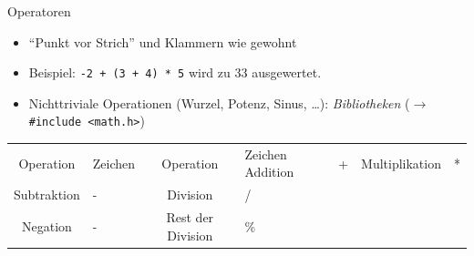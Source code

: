 
\begin{frame}[fragile]{Operatoren}
%
\begin{itemize}
	\item \enquote{Punkt vor Strich} und Klammern wie gewohnt
	\item Beispiel: \texttt{-2 + (3 + 4) * 5} wird zu 33 ausgewertet.
	\item Nichttriviale Operationen (Wurzel, Potenz, Sinus, \ldots): \emph{Bibliotheken}\newline
		($\rightarrow$ \texttt{#include <math.h>})
\end{itemize}
%
\begin{center}
\begin{tcolorbox}[title=Grundrechenarten in C]
\begin{table}
	\small
\begin{tabularx}
	{.8\linewidth}
	{cC|cC}
	
	Operation   & \normalfont Zeichen  &  Operation         & \normalfont Zeichen \tabcrlf
	Addition    & +                    &  Multiplikation    & * \\
	Subtraktion & -                    &  Division          & / \\
	Negation    & -                    &  Rest der Division & \%
\end{tabularx}
\end{table}
\end{tcolorbox}
\end{center}
%
\end{frame}


